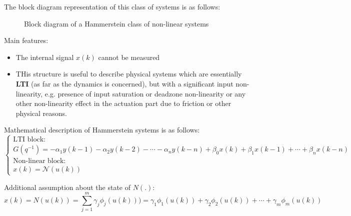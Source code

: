 The block diagram representation of this class of systems is as follows:


\begin{figure}[h!]
\centering
{}
\caption{Block diagram of a Hammerstein class of non-linear systems}
\label{fig:hammerstein}
\end{figure}

Main features:
\begin{itemize}
    \item The internal signal $x(k)$ cannot be measured
    \item THis structure is useful to describe physical systems which are essentially \textbf{LTI} (as far as the dynamics is concerned), but with a significant input non-linearity, e.g. presence of input saturation or deadzone non-linearity or any other non-linearity effect in the actuation part due to friction or other physical reasons.
\end{itemize}

Mathematical description of Hammerstein systems is as follows:
\[
\begin{cases}
\text{LTI block:}\\G(q^{-1}) = -\alpha_1y(k-1) - \alpha_2y(k-2) -\cdots -\alpha_ny(k-n)+\beta_0x(k)+\beta_1x(k-1)+\cdots + \beta_nx(k-n)\\
\text{Non-linear block:} \\x(k) = \mathcal{N}(u(k))
\end{cases}
\]

Additional assumption about the state of $N(.)$:
\[
x(k) = N(u(k)) = \sum_{j = 1}^{m}\gamma_j\phi_j(u(k))) = \gamma_1\phi_1(u(k)) + \gamma_2\phi_2(u(k)) + \cdots + \gamma_m\phi_m(u(k))
\]

